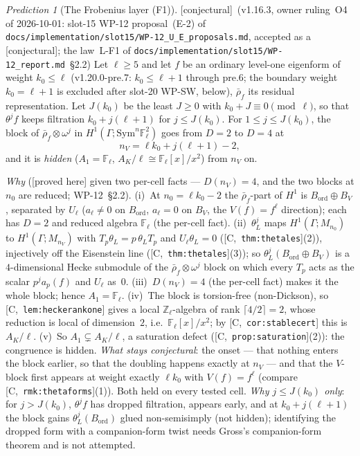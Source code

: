 \documentclass[11pt]{article}
\theoremstyle{remark}
\newtheorem{prediction}[theorem]{Prediction}
\newcommand{\F}{\mathbb{F}}
\newcommand{\Z}{\mathbb{Z}}
\newcommand{\Sym}{\mathrm{Sym}}
\newcommand{\Ga}{\Gamma}
\newcommand{\Fl}{\F_\ell}
\newcommand{\HA}[1]{[C,~\texttt{#1}]}      %
\newcommand{\PROVED}{\textsf{[proved here]}}
\newcommand{\CONJ}{\textsf{[conjectural]}}
\begin{document}
\begin{prediction}[The Frobenius layer (F1)]\label{pr:frobeniuslayer}\CONJ\ (v1.16.3, owner ruling~O4 of 2026-10-01: slot-15 WP-12
proposal~(E-2) of \texttt{docs/implementation/slot15/WP-12\_U\_E\_proposals.md}, accepted as a \CONJ; the law~L-F1 of
\texttt{docs/implementation/slot15/WP-12\_report.md}~\S2.2)
Let $\ell\ge5$ and let $f$ be an ordinary level-one eigenform of weight $k_0\le\ell$ (v1.20.0-pre.7: $k_0\le\ell+1$ through pre.6; the boundary weight $k_0=\ell+1$ is excluded after slot-20 WP-SW, below), $\bar\rho_f$ its residual representation. Let
$J(k_0)$ be the least $J\ge0$ with $k_0+J\equiv0\pmod\ell$, so that $\theta^jf$ keeps filtration $k_0+j(\ell+1)$ for $j\le J(k_0)$. For
$1\le j\le J(k_0)$, the block of $\bar\rho_f\otimes\omega^j$ in $H^1(\Ga;\Sym^n\Fl^2)$ goes from $D=2$ to $D=4$ at
\[
  n_V=\ell k_0+j(\ell+1)-2,
\]
and it is \emph{hidden} ($A_1=\Fl$, $A_K/\ell\cong\Fl[x]/x^2$) from $n_V$ on.

\emph{Why} (\PROVED{} given two per-cell facts --- $D(n_V)=4$, and the two blocks at $n_0$ are reduced; WP-12~\S2.2).
(i)~At $n_0=\ell k_0-2$ the $\bar\rho_f$-part of $H^1$ is $B_{\mathrm{ord}}\oplus B_V$, separated by $U_\ell$ ($a_\ell\ne0$ on
$B_{\mathrm{ord}}$, $a_\ell=0$ on $B_V$, the $V(f)=f^\ell$ direction); each has $D=2$ and reduced algebra $\Fl$ (the per-cell fact).
(ii)~$\theta_L^j$ maps $H^1(\Ga;M_{n_0})$ to $H^1(\Ga;M_{n_V})$ with $T_p\theta_L=p\,\theta_LT_p$ and $U_\ell\theta_L=0$
(\HA{thm:thetales}(2)), injectively off the Eisenstein line (\HA{thm:thetales}(3)); so $\theta_L^j(B_{\mathrm{ord}}\oplus B_V)$ is a
$4$-dimensional Hecke submodule of the $\bar\rho_f\otimes\omega^j$ block on which every $T_p$ acts as the scalar $p^ja_p(f)$ and $U_\ell$
as~$0$. (iii)~$D(n_V)=4$ (the per-cell fact) makes it the whole block; hence $A_1=\Fl$. (iv)~The block is torsion-free (non-Dickson), so
\HA{lem:heckerankone} gives a local $\Z_\ell$-algebra of rank $\lceil4/2\rceil=2$, whose reduction is local of dimension~$2$, i.e.\
$\Fl[x]/x^2$; by \HA{cor:stablecert} this is $A_K/\ell$. (v)~So $A_1\subsetneq A_K/\ell$, a saturation defect
(\HA{prop:saturation}(2)): the congruence is hidden.
\emph{What stays conjectural}: the onset --- that nothing enters the block earlier, so that the doubling happens exactly at $n_V$ --- and
that the $V$-block first appears at weight exactly $\ell k_0$ with $V(f)=f^\ell$ (compare \HA{rmk:thetaforms}(1)). Both held on every
tested cell. \emph{Why $j\le J(k_0)$ only}: for $j>J(k_0)$, $\theta^jf$ has dropped filtration, appears early, and at $k_0+j(\ell+1)$
the block gains $\theta_L^j(B_{\mathrm{ord}})$ glued non-semisimply (not hidden); identifying the dropped form with a companion-form
twist needs Gross's companion-form theorem and is not attempted.


\end{prediction}
\end{document}
